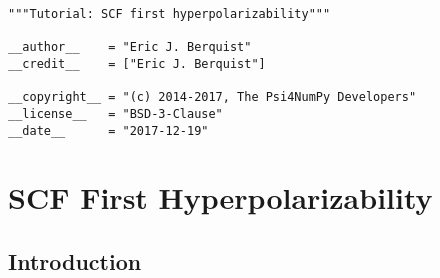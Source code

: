 \begin{verbatim}
"""Tutorial: SCF first hyperpolarizability"""

__author__    = "Eric J. Berquist"
__credit__    = ["Eric J. Berquist"]

__copyright__ = "(c) 2014-2017, The Psi4NumPy Developers"
__license__   = "BSD-3-Clause"
__date__      = "2017-12-19"
\end{verbatim}

\hypertarget{scf-first-hyperpolarizability}{%
  \section{SCF First Hyperpolarizability}\label{scf-first-hyperpolarizability}}

\hypertarget{introduction}{%
  \subsection{Introduction}\label{introduction}}

